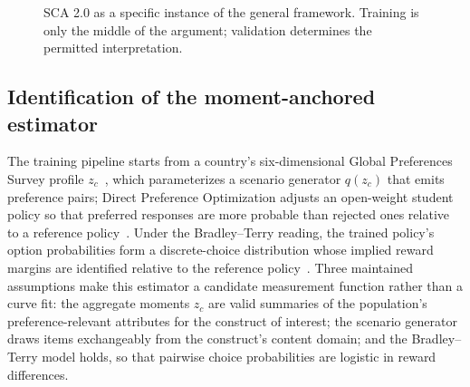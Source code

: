 \documentclass[10pt,letterpaper]{article}
\newcommand{\GPS}{\textsc{gps}}
\begin{document}
\begin{figure}[t]
\centering
{}
\caption{SCA 2.0 as a specific instance of the general framework. Training is only the middle of the argument; validation determines the permitted interpretation.}
\label{fig:sca}
\end{figure}

\subsection{Identification of the moment-anchored estimator}

The training pipeline starts from a country's six-dimensional Global Preferences Survey profile $z_c$~\cite{falk2018}, which parameterizes a scenario generator $q(z_c)$ that emits preference pairs; Direct Preference Optimization adjusts an open-weight student policy so that preferred responses are more probable than rejected ones relative to a reference policy~\cite{rafailov2023}. Under the Bradley--Terry reading, the trained policy's option probabilities form a discrete-choice distribution whose implied reward margins are identified relative to the reference policy~\cite{bradley1952,rafailov2023}. Three maintained assumptions make this estimator a candidate measurement function rather than a curve fit: the aggregate moments $z_c$ are valid summaries of the population's preference-relevant attributes for the construct of interest; the scenario generator draws items exchangeably from the construct's content domain; and the Bradley--Terry model holds, so that pairwise choice probabilities are logistic in reward differences.
\end{document}
